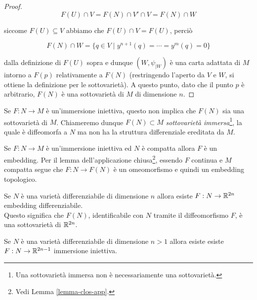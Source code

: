 \begin{proof}
	\begin{equation}
		F(U) \cap V = F(N) \cap V' \cap V = F(N) \cap W
	\end{equation}

	siccome $ F(U) \subseteq V $ abbiamo che $ F(U) \cap V = F(U) $, perciò
	
	\begin{equation}
		F(N) \cap W = \{ q \in V \mid y^{n+1}(q) = \cdots = y^{m}(q) = 0 \}
	\end{equation}

	dalla definizione di $ F(U) $ sopra e dunque $ (W,\psi_{|W}) $ è una carta adattata di $ M $ intorno a $ F(p) $ relativamente a $ F(N) $ (restringendo l'aperto da $ V $ e $ W $, si ottiene la definizione per le sottovarietà). A questo punto, dato che il punto $ p $ è arbitrario, $ F(N) $ è una sottovarietà di $ M $ di dimensione $ n $.
\end{proof}

\begin{remark}[1]
	Se $ F : N \to M $ è un'immersione iniettiva, questo non implica che $ F(N) $ sia una sottovarietà di $ M $. Chiameremo dunque $ F(N) \subset M $ \textit{sottovarietà immersa}\footnote{%
		Una sottovarietà immersa non è necessariamente una sottovarietà.%
	}, la quale è diffeomorfa a $ N $ ma non ha la struttura differenziale ereditata da $ M $.
\end{remark}

\begin{remark}[2]
	Se $ F : N \to M $ è un'immersione iniettiva ed $ N $ è compatta allora $ F $ è un embedding. Per il lemma dell'applicazione chiusa\footnote{%
		Vedi Lemma \ref{lemma-clos-app}.%
	}, essendo $ F $ continua e $ M $ compatta segue che $ F : N \to F(N) $ è un omeomorfismo e quindi un embedding topologico.
\end{remark}

\begin{theorem}[Whitney]
	Se $ N $ è una varietà differenziabile di dimensione $ n $ allora esiste $ F : N \to \mathbb{R}^{2n} $ embedding differenziabile.\\
	Questo significa che $ F(N) $, identificabile con $ N $ tramite il diffeomorfismo $ F $, è una sottovarietà di $ \mathbb{R}^{2n} $.
\end{theorem}

\begin{theorem}
	Se $ N $ è una varietà differenziabile di dimensione $ n>1 $ allora esiste esiste $ F : N \to \mathbb{R}^{2n-1} $ immersione iniettiva.
\end{theorem}

